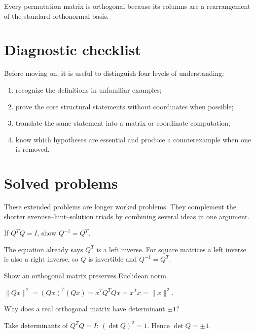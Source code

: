 \begin{example}\label{ex:i15-worked-03}
Every permutation matrix is orthogonal because its columns are a rearrangement of the standard orthonormal basis.
\end{example}

\section{Diagnostic checklist}
Before moving on, it is useful to distinguish four levels of understanding:
\begin{enumerate}
\item recognize the definitions in unfamiliar examples;
\item prove the core structural statements without coordinates when possible;
\item translate the same statement into a matrix or coordinate computation;
\item know which hypotheses are essential and produce a counterexample when one is removed.
\end{enumerate}

\section{Solved problems}
These extended problems are longer worked problems. They complement the shorter exercise--hint--solution triads by combining several ideas in one argument.

\begin{problem}\label{prob:i15-problem-01}
If $Q^TQ=I$, show $Q^{-1}=Q^T$.
\end{problem}
\begin{solution}
The equation already says $Q^T$ is a left inverse. For square matrices a left inverse is also a right inverse, so $Q$ is invertible and $Q^{-1}=Q^T$.
\end{solution}

\begin{problem}\label{prob:i15-problem-02}
Show an orthogonal matrix preserves Euclidean norm.
\end{problem}
\begin{solution}
$\|Qx\|^2=(Qx)^T(Qx)=x^TQ^TQx=x^Tx=\|x\|^2$.
\end{solution}

\begin{problem}\label{prob:i15-problem-03}
Why does a real orthogonal matrix have determinant $\pm1$?
\end{problem}
\begin{solution}
Take determinants of $Q^TQ=I$: $(\det Q)^2=1$. Hence $\det Q=\pm1$.
\end{solution}

